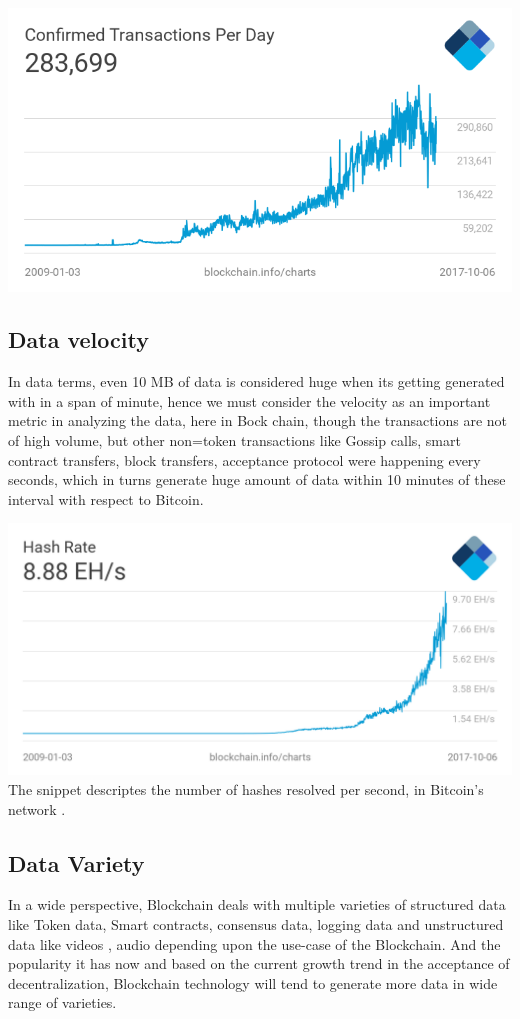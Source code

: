 \documentclass[sigconf]{acmart}
\begin{document}
\includegraphics[scale=0.35]{paper1/images/bitcoin-trans.png}
\subsection{Data velocity}
In data terms, even 10 MB of data is considered huge when its getting generated with in a span of minute, hence we must consider the velocity as an important metric in analyzing the data, here in Bock chain, though the transactions are not of high volume, but other non=token transactions like Gossip calls, smart contract transfers, block transfers, acceptance protocol were happening every seconds, which in turns generate huge amount of data within 10 minutes of these interval with respect to Bitcoin.

\includegraphics[scale=0.2]{paper1/images/hash-rate.png}
The snippet descriptes the number of hashes resolved per second, in Bitcoin's network \cite{hastratepersec}.

\subsection{Data Variety}
In a wide perspective, Blockchain deals with multiple varieties of structured data like Token data, Smart contracts, consensus data, logging data and unstructured data like videos \cite{livepeer-BC}, audio depending upon the use-case of the Blockchain. And the popularity it has now and based on the current growth trend in the acceptance of decentralization, Blockchain technology will tend to generate more data in wide range of varieties.
\end{document}
